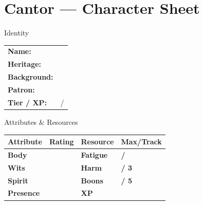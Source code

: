 \documentclass[10pt]{article}
\begin{document}
\newpage

\section*{Cantor --- Character Sheet}

\begin{minipage}[t]{0.48\linewidth}
    \begin{charbox}{Identity}
        \begin{tabular}{p{2.5cm} p{5cm}}
            \textbf{Name:} & \underline{\hspace{4cm}} \\
            \textbf{Heritage:} & \underline{\hspace{4cm}} \\
            \textbf{Background:} & \underline{\hspace{4cm}} \\
            \textbf{Patron:} & \underline{\hspace{4cm}} \\
            \textbf{Tier / XP:} & \underline{\hspace{2cm}} / \underline{\hspace{2cm}} \\
        \end{tabular}
    \end{charbox}
    
    \vspace{0.5em}
    
    \begin{charbox}{Attributes \& Resources}
        \begin{tabular}{>{\bfseries}p{2.5cm} >{\bfseries}p{1.5cm} >{\bfseries}p{2.5cm} >{\bfseries}p{1.5cm}}
            \toprule
            \textbf{Attribute} & \textbf{Rating} & \textbf{Resource} & \textbf{Max/Track} \\
            \midrule
            Body & \underline{\hspace{1.5cm}} & Fatigue & \underline{\hspace{1.5cm}} / \underline{\hspace{1.5cm}} \\
            Wits & \underline{\hspace{1.5cm}} & Harm & \underline{\hspace{1.5cm}} / 3 \\
            Spirit & \underline{\hspace{1.5cm}} & Boons & \underline{\hspace{1.5cm}} / 5 \\
            Presence & \underline{\hspace{1.5cm}} & XP & \underline{\hspace{1.5cm}} \\
            \bottomrule
        \end{tabular}
    \end{charbox}
    

\end{minipage}
\end{document}
